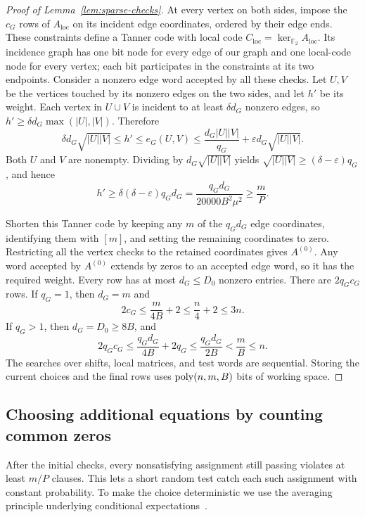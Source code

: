 \begin{proof}[Proof of Lemma~\ref{lem:sparse-checks}]
At every vertex on both sides, impose the $c_G$ rows of
$A_{\mathrm{loc}}$ on its incident edge coordinates, ordered by
their edge ends. These constraints define a Tanner code with local
code $C_{\mathrm{loc}}=\ker_{\mathbb F_2}A_{\mathrm{loc}}$.
Its incidence graph has one bit node for every edge of our graph
and one local-code node for every vertex; each bit participates
in the constraints at its two endpoints.
Consider a nonzero edge word accepted by all these
checks. Let $U,V$ be the vertices touched by its nonzero edges on
the two sides, and let $h'$ be its weight. Each vertex in $U\cup V$
is incident to at least $\delta d_G$ nonzero edges, so
$h'\ge\delta d_G\max(|U|,|V|)$. Therefore
\[
 \delta d_G\sqrt{|U||V|}
 \le h'\le e_G(U,V)
 \le\frac{d_G|U||V|}{q_G}
       +\varepsilon d_G\sqrt{|U||V|}.
\]
Both $U$ and $V$ are nonempty. Dividing by
$d_G\sqrt{|U||V|}$ yields
$\sqrt{|U||V|}\ge(\delta-\varepsilon)q_G$, and hence
\[
 h'\ge\delta(\delta-\varepsilon)q_Gd_G
 =\frac{q_Gd_G}{20000B^2\mu^2}\ge\frac mP.
\]

Shorten this Tanner code by keeping any $m$ of the $q_Gd_G$ edge
coordinates, identifying them with $[m]$, and setting the remaining
coordinates to zero. Restricting all
the vertex checks to the retained coordinates gives $A^{(0)}$.
Any word accepted by $A^{(0)}$ extends by zeros to an accepted edge
word, so it has the required weight. Every row has at most
$d_G\le D_0$ nonzero entries. There are $2q_Gc_G$ rows. If $q_G=1$,
then $d_G=m$ and
\[
 2c_G\le\frac{m}{4B}+2\le\frac n4+2\le3n.
\]
If $q_G>1$, then $d_G=D_0\ge8B$, and
\[
 2q_Gc_G\le\frac{q_Gd_G}{4B}+2q_G
 \le\frac{q_Gd_G}{2B}<\frac mB\le n.
\]
The searches over shifts, local matrices, and test words are
sequential. Storing the current choices and the final rows uses
$\operatorname{poly}(n,m,B)$ bits of working space.
\end{proof}

\subsection{Choosing additional equations by counting common zeros}
After the initial checks, every nonsatisfying assignment still passing
violates at least $m/P$ clauses. This lets a short random test catch
each such assignment with constant probability. To make the choice
deterministic we use the averaging principle underlying conditional
expectations~\cite{Raghavan88}.

